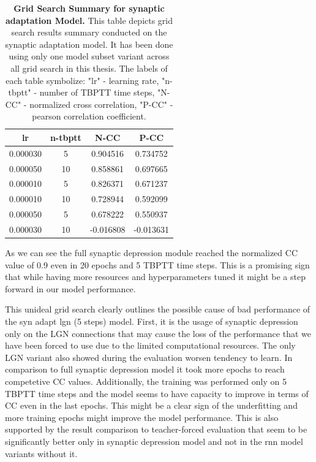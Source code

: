 \begin{table}
    \centering\footnotesize\sf
    \begin{tabular}{cccc}
    \toprule
    lr & n-tbptt & N-CC & P-CC \\
    \midrule
    0.000030 & 5 & 0.904516 & 0.734752 \\
    0.000050 & 10 & 0.858861 & 0.697665 \\
    0.000010 & 5 & 0.826371 & 0.671237 \\
    0.000010 & 10 & 0.728944 & 0.592099 \\
    0.000050 & 5 & 0.678222 & 0.550937 \\
    0.000030 & 10 & -0.016808 & -0.013631 \\
    \bottomrule
    \end{tabular}
    \caption{\textbf{Grid Search Summary for synaptic adaptation Model.} This table depicts grid search results summary conducted on the synaptic adaptation model. It has been done using only one model subset variant across all grid search in this thesis. The labels of each table symbolize: "lr" - learning rate, "n-tbptt" - number of TBPTT time steps, "N-CC" - normalized cross correlation, "P-CC" - pearson correlation coefficient.}
    \label{tab:grid_synaptic_adaptation}
\end{table}

As we can see the full synaptic depression module reached the normalized CC value of 0.9 even in 20 epochs and 5 TBPTT time steps. This is a promising sign that while having more resources and hyperparameters tuned it might be a step forward in our model performance.

This unideal grid search clearly outlines the possible cause of bad performance of the syn adapt lgn (5 steps) model. First, it is the usage of synaptic depression only on the LGN connections that may cause the loss of the performance that we have been forced to use due to the limited computational resources. The only LGN variant also showed during the evaluation worsen tendency to learn. In comparison to full synaptic depression model it took more epochs to reach competetive CC values. Additionally, the training was performed only on 5 TBPTT time steps and the model seems to have capacity to improve in terms of CC even in the last epochs. This might be a clear sign of the underfitting and more training epochs might improve the model performance. This is also supported by the result comparison to teacher-forced evaluation that seem to be significantly better only in synaptic depression model and not in the rnn model variants without it. 


